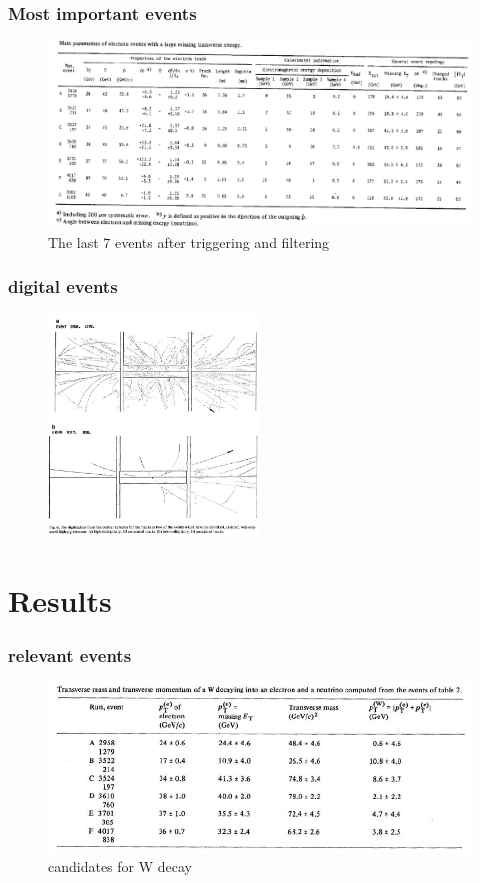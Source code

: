 \documentclass{beamer}
\begin{document}
\begin{frame}
	\frametitle{Most important events}
	\begin{figure}
		\includegraphics[width=1.0\textwidth]{events}
		\caption{The last 7 events after triggering and filtering}
	\end{figure}
\end{frame}

\begin{frame}
	\frametitle{digital events}
	\begin{figure}
		\includegraphics[width=0.5\textwidth]{digital_event}
	\end{figure}
\end{frame}


\section{Results}
\begin{frame}
	\frametitle{relevant events}
	\begin{figure}
		\includegraphics[width=1.0\textwidth]{events2}
		\caption{candidates for W decay}
	\end{figure}
\end{frame}
\end{document}
